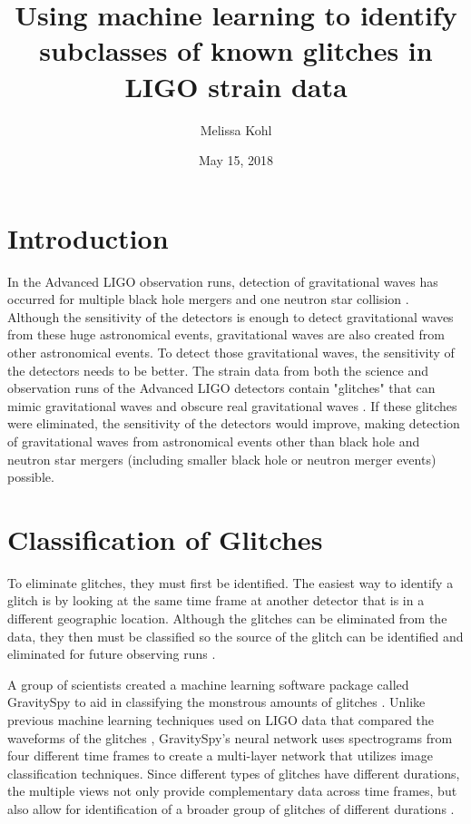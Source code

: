 \documentclass[a4paper]{article}
\title{Using machine learning to identify subclasses of known glitches in LIGO strain data}
\author{Melissa Kohl}
\date{May 15, 2018}
\begin{document}
\maketitle

\section{Introduction}

In the Advanced LIGO observation runs, detection of gravitational waves has occurred for multiple black hole mergers and one neutron star collision \cite{Zevin:2016}. Although the sensitivity of the detectors is enough to detect gravitational waves from these huge astronomical events, gravitational waves are also created from other astronomical events. To detect those gravitational waves, the sensitivity of the detectors needs to be better. The strain data from both the science and observation runs of the Advanced LIGO detectors contain "glitches" that can mimic gravitational waves and obscure real gravitational waves \cite{Zevin:2016}. If these glitches were eliminated, the sensitivity of the detectors would improve, making detection of gravitational waves from astronomical events other than black hole and neutron star mergers (including smaller black hole or neutron merger events) possible. 

\section{Classification of Glitches}

To eliminate glitches, they must first be identified. The easiest way to identify a glitch is by looking at the same time frame at another detector that is in a different geographic location. Although the glitches can be eliminated from the data, they then must be classified so the source of the glitch can be identified and eliminated for future observing runs \cite{Mukherjee:2010}. 

A group of scientists created a machine learning software package called GravitySpy to aid in classifying the monstrous amounts of glitches \cite{Zevin:2016}. Unlike previous machine learning techniques used on LIGO data that compared the waveforms of the glitches \cite{Mukherjee:2010}, GravitySpy's neural network uses spectrograms from four different time frames to create a multi-layer network that utilizes image classification techniques. Since different types of glitches have different durations, the multiple views not only provide complementary data across time frames, but also allow for identification of a broader group of glitches of different durations \cite{Bahaadini:2017}.  
\end{document}
